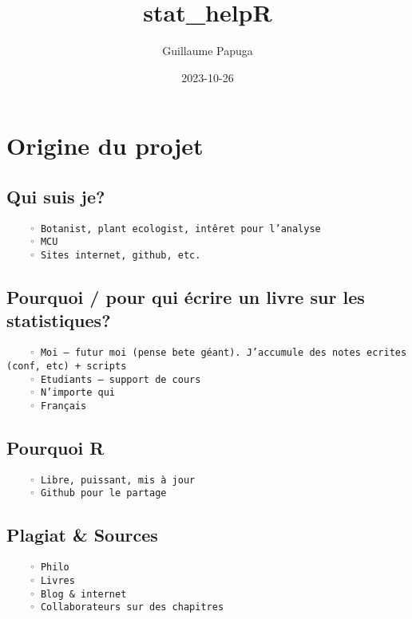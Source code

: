 \documentclass[
]{book}
\title{stat\_helpR}
\author{Guillaume Papuga}
\date{2023-10-26}
\begin{document}
\maketitle

{
\setcounter{tocdepth}{1}
\tableofcontents
}
\hypertarget{origine-du-projet}{%
\chapter{Origine du projet}\label{origine-du-projet}}

\hypertarget{qui-suis-je}{%
\section{Qui suis je?}\label{qui-suis-je}}

\begin{verbatim}
    ◦ Botanist, plant ecologist, intêret pour l’analyse
    ◦ MCU
    ◦ Sites internet, github, etc.
\end{verbatim}

\hypertarget{pourquoi-pour-qui-uxe9crire-un-livre-sur-les-statistiques}{%
\section{Pourquoi / pour qui écrire un livre sur les statistiques?}\label{pourquoi-pour-qui-uxe9crire-un-livre-sur-les-statistiques}}

\begin{verbatim}
    ◦ Moi – futur moi (pense bete géant). J’accumule des notes ecrites (conf, etc) + scripts
    ◦ Etudiants – support de cours
    ◦ N’importe qui
    ◦ Français
\end{verbatim}

\hypertarget{pourquoi-r}{%
\section{Pourquoi R}\label{pourquoi-r}}

\begin{verbatim}
    ◦ Libre, puissant, mis à jour
    ◦ Github pour le partage
\end{verbatim}

\hypertarget{plagiat-sources}{%
\section{Plagiat \& Sources}\label{plagiat-sources}}

\begin{verbatim}
    ◦ Philo
    ◦ Livres
    ◦ Blog & internet
    ◦ Collaborateurs sur des chapitres 
\end{verbatim}
\end{document}
